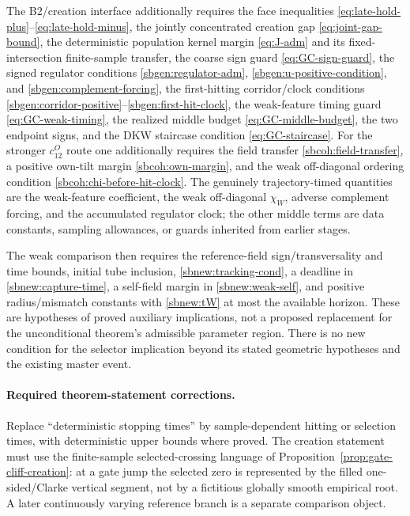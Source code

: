\documentclass{article} %
\theoremstyle{plain}
\theoremstyle{definition}
\theoremstyle{remark}
\begin{document}
The B2/creation interface additionally requires the face inequalities
\eqref{eq:late-hold-plus}--\eqref{eq:late-hold-minus}, the jointly
concentrated creation gap \eqref{eq:joint-gap-bound}, the deterministic
population kernel margin \eqref{eq:J-adm} and its fixed-intersection
finite-sample transfer, the coarse sign guard \eqref{eq:GC-sign-guard}, the
signed regulator conditions \eqref{sbgen:regulator-adm},
\eqref{sbgen:u-positive-condition}, and
\eqref{sbgen:complement-forcing}, the first-hitting corridor/clock conditions
\eqref{sbgen:corridor-positive}--\eqref{sbgen:first-hit-clock}, the
weak-feature timing guard \eqref{eq:GC-weak-timing}, the realized middle
budget \eqref{eq:GC-middle-budget}, the two endpoint signs, and the DKW
staircase condition \eqref{eq:GC-staircase}.  For the stronger $c_{12}^O$
route one additionally requires the field transfer
\eqref{sbcoh:field-transfer}, a positive own-tilt margin
\eqref{sbcoh:own-margin}, and the weak off-diagonal ordering condition
\eqref{sbcoh:chi-before-hit-clock}.  The genuinely trajectory-timed
quantities are the weak-feature coefficient, the weak off-diagonal
$\chi_W$, adverse complement forcing, and the accumulated regulator clock;
the other middle terms are data constants, sampling allowances, or guards
inherited from earlier stages.

The weak comparison then requires the reference-field sign/transversality
and time bounds, initial tube inclusion, \eqref{sbnew:tracking-cond}, a
deadline in \eqref{sbnew:capture-time}, a self-field margin in
\eqref{sbnew:weak-self}, and positive radius/mismatch constants with
\eqref{sbnew:tW} at most the available horizon. These are hypotheses of
proved auxiliary implications, not a proposed replacement for the
unconditional theorem's admissible parameter region. There is no new
condition for the selector implication beyond its stated geometric
hypotheses and the existing master event.

\paragraph{Required theorem-statement corrections.}
Replace ``deterministic stopping times'' by sample-dependent hitting or
selection times, with deterministic upper bounds where proved. The creation
statement must use the finite-sample selected-crossing language of
Proposition~\ref{prop:gate-cliff-creation}: at a gate jump the selected zero
is represented by the filled one-sided/Clarke vertical segment, not by a
fictitious globally smooth empirical root. A later continuously varying
reference branch is a separate comparison object.
\end{document}
